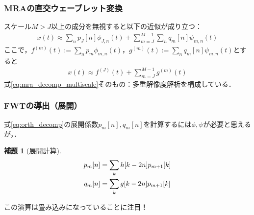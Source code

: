 \documentclass[dvipdfmx,graphicx,14pt]{beamer}
\newcommand{\roverline}[1]{\mathpalette\doroverline{#1}}
\newcommand{\doroverline}[2]{\overline{#1#2}}
\newtheorem{mylemma}{補題}
\begin{document}
\begin{frame}[c]
    \frametitle{MRAの直交ウェーブレット変換}
    スケール$M > J$以上の成分を無視すると以下の近似が成り立つ：
    \begin{align}
        x(t) \approx \sum_{n} p_{J}[n] \phi_{J,n}(t) + \sum_{m=J}^{M-1}\sum_{n} q_{m}[n] \psi_{m,n}(t) \label{eq:orth_approx}
    \end{align}
    ここで，$f^{(m)}(t) := \sum_{n} p_{m} \phi_{m,n}(t)$，$g^{(m)}(t) := \sum_{n} q_{m}[n] \psi_{m,n}(t)$とすると
    \begin{align*}
        x(t) \approx f^{(J)}(t) + \sum_{m=J}^{M-1} g^{(m)}(t)
    \end{align*}
    式\eqref{eq:mra_decomp_multiscale}そのもの：多重解像度解析を構成している．
\end{frame}

\begin{frame}[c]
    \frametitle{FWTの導出（展開）}
    式\eqref{eq:orth_decomp}の展開係数$p_{m}[n], q_{m}[n]$を計算するには$\phi, \psi$が必要と思えるが，．
    \begin{mylemma}[展開計算]
        \vspace*{-15pt}
        \begin{align}
            p_{m}[n] &= \sum_{k} \roverline{h[k - 2n]} p_{m+1}[k] \label{eq:scaling_coef_updation} \\
            q_{m}[n] &= \sum_{k} \roverline{g[k - 2n]} p_{m+1}[k] \label{eq:wavelet_coef_updation}
        \end{align}
    \end{mylemma}
    この演算は畳み込みになっていることに注目！
\end{frame}
\end{document}
